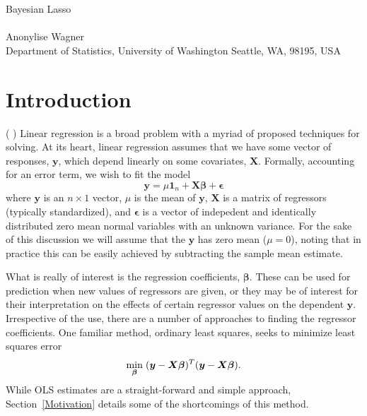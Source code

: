 \documentclass{uwstat572}
\newcommand{\vmcomment}[1]{({\color{blue}{VM's comment:}} \textbf{\color{blue}{#1}})}
\begin{document}

\begin{center}
  {\LARGE Bayesian Lasso}\\\ \\
  {Anonylise Wagner \\ 
    Department of Statistics, University of Washington Seattle, WA, 98195, USA
  }
\end{center}



\begin{abstract}
  The Bayesian Lasso, building on the interpretation of Tibshirani, places Laplace priors on linear regression coefficients to allow for Bayesian approaches to parameter and error estimation. An efficient Gibbs sampler allows for quick computation and may be exanded to other forms of penalized regression.
\end{abstract}

\section{Introduction}
\vmcomment{Your introduction looks more like beginning of the Methods section to me. Ideally, intro should introduce the problem without formulae. Need to motivate sparsity and give a literature review of sparse regression, explaining why it is useful and what people have done before Park and Casella paper.}
Linear regression is a broad problem with a myriad of proposed techniques for solving. At its heart, linear regression assumes that we have some vector of responses, $\boldsymbol{y}$, which depend linearly on some covariates, $\boldsymbol{X}$. Formally, accounting for an error term, we wish to fit the model \[
\boldsymbol{y} = \mu \boldsymbol{1}_n + \boldsymbol{X}\boldsymbol{\beta}+\boldsymbol{\epsilon}
\] where $\boldsymbol{y}$ is an $n \times 1$ vector, $\mu$ is the mean of $\boldsymbol{y}$, $\boldsymbol{X}$ is a matrix of regressors (typically standardized), and $\boldsymbol{\epsilon}$ is a vector of indepedent and identically distributed zero mean normal variables with an unknown variance. For the sake of this discussion we will assume that the $\boldsymbol{y}$ has zero mean ($\mu=0$), noting that in practice this can be easily achieved by subtracting the sample mean estimate.

What is really of interest is the regression coefficients, $\boldsymbol{\beta}$. These can be used for prediction when new values of regressors are given, or they may be of interest for their interpretation on the effects of certain regressor values on the dependent $\boldsymbol{y}$. Irrespective of the use, there are a number of approaches to finding the regressor coefficients. One familiar method, ordinary least squares, seeks to minimize least squares error\[
\min_{\boldsymbol{\beta}} \hspace{.1cm} (\boldsymbol{y}-\boldsymbol{X}\boldsymbol{\beta})^T(\boldsymbol{y}-\boldsymbol{X}\boldsymbol{\beta}).
\] While OLS estimates are a straight-forward and simple approach, Section~\ref{Motivation} details some of the shortcomings of this method.
\end{document}
